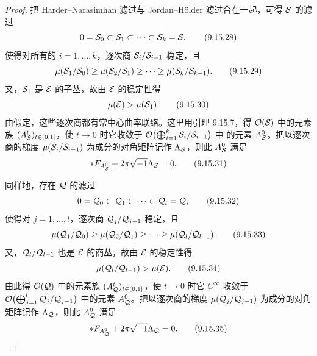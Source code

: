 \begin{proof}
  把 Harder--Narasimhan 滤过与 Jordan--Hölder 滤过合在一起，可得 $\mathcal{S}$ 的滤过
  \begin{equation}
    0=\mathcal{S}_0\subset\mathcal{S}_1\subset\cdots\subset\mathcal{S}_k=\mathcal{S},
    \tag{9.15.28}
  \end{equation}
  使得对所有的 $i=1,\dots,k$，逐次商 $\mathcal{S}_i/\mathcal{S}_{i-1}$ 稳定，且
  \begin{equation}
    \mu(\mathcal{S}_1/\mathcal{S}_0)\ge\mu(\mathcal{S}_2/\mathcal{S}_1)\ge\cdots\ge\mu(\mathcal{S}_k/\mathcal{S}_{k-1}).
    \tag{9.15.29}
  \end{equation}
  又，$\mathcal{S}_1$ 是 $\mathcal{E}$ 的子丛，故由 $\mathcal{E}$ 的稳定性得
  \begin{equation}
    \mu(\mathcal{E})>\mu(\mathcal{S}_1).
    \tag{9.15.30}
  \end{equation}
  由假定，这些逐次商都有常中心曲率联络。这里用引理 9.15.7，得 $\mathcal{O}(\mathcal{S})$ 中的元素族 $(A^t_{\mathcal{S}})_{t\in(0,1]}$，使 $t\to0$ 时它收敛于 $\mathcal{O}\bigl(\bigoplus_{i=1}^k\mathcal{S}_i/\mathcal{S}_{i-1}\bigr)$ 中
  的元素 $A^0_{\mathcal{S}}$。把以逐次商的梯度 $\mu(\mathcal{S}_i/\mathcal{S}_{i-1})$ 为成分的对角矩阵记作 $\Lambda_{\mathcal{S}}$，则此 $A^0_{\mathcal{S}}$ 满足
  \begin{equation}
    \ast F_{A^0_{\mathcal{S}}}+2\pi\sqrt{-1}\Lambda_{\mathcal{S}}=0.
    \tag{9.15.31}
  \end{equation}

  同样地，存在 $\mathcal{Q}$ 的滤过
  \begin{equation}
    0=\mathcal{Q}_0\subset\mathcal{Q}_1\subset\cdots\subset\mathcal{Q}_l=\mathcal{Q},
    \tag{9.15.32}
  \end{equation}
  使得对 $j=1,\dots,l$，逐次商 $\mathcal{Q}_j/\mathcal{Q}_{j-1}$ 稳定，且
  \begin{equation}
    \mu(\mathcal{Q}_1/\mathcal{Q}_0)\ge\mu(\mathcal{Q}_2/\mathcal{Q}_1)\ge\cdots\ge\mu(\mathcal{Q}_l/\mathcal{Q}_{l-1}).
    \tag{9.15.33}
  \end{equation}
  又，$\mathcal{Q}_l/\mathcal{Q}_{l-1}$ 也是 $\mathcal{E}$ 的商丛，故由 $\mathcal{E}$ 的稳定性得
  \begin{equation}
    \mu(\mathcal{Q}_l/\mathcal{Q}_{l-1})>\mu(\mathcal{E}).
    \tag{9.15.34}
  \end{equation}
  由此得 $\mathcal{O}(\mathcal{Q})$ 中的元素族 $(A^t_{\mathcal{Q}})_{t\in(0,1]}$，使 $t\to0$ 时它 $C^\infty$ 收敛于 $\mathcal{O}\bigl(\bigoplus_{j=1}^l\mathcal{Q}_j/\mathcal{Q}_{j-1}\bigr)$ 中的元素 $A^0_{\mathcal{Q}}$。把以逐次商的梯度 $\mu(\mathcal{Q}_j/\mathcal{Q}_{j-1})$ 为成分的对角矩阵记作 $\Lambda_{\mathcal{Q}}$，则此 $A^0_{\mathcal{Q}}$ 满足
  \begin{equation}
    \ast F_{A^0_{\mathcal{Q}}}+2\pi\sqrt{-1}\Lambda_{\mathcal{Q}}=0.
    \tag{9.15.35}
  \end{equation}


\end{proof}
